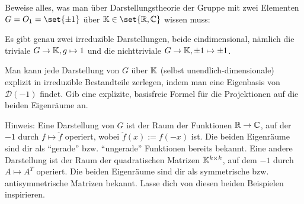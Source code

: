 
\setcounter{sheet}{\thesection}
\setcounter{problem}{0}

\begin{problem}[title={Darstellungstheorie von $O_1$}]
Beweise alles, was man über Darstellungstheorie der Gruppe mit zwei Elementen $G=O_1=\set{\pm 1}$ über $\IK\in\set{\IR,\IC}$ wissen muss:

\begin{subproblem}
Es gibt genau zwei irreduzible Darstellungen, beide eindimensional, nämlich die triviale $G\to\mathbb{K}, g\mapsto 1$ und die nichttriviale $G\to\mathbb{K}, \pm 1\mapsto \pm 1$.
\end{subproblem}
\begin{subproblem}
Man kann jede Darstellung von $G$ über $\mathbb{K}$ (selbst unendlich-dimensionale) explizit in irreduzible Bestandteile zerlegen, indem man eine Eigenbasis von $\mathcal{D}(-1)$ findet. Gib eine explizite, basisfreie Formel für die Projektionen auf die beiden Eigenräume an.
\end{subproblem}

Hinweis: Eine Darstellung von $G$ ist der Raum der Funktionen $\mathbb{R} \to \mathbb{C}$, auf der $-1$ durch $f\mapsto \check{f}$ operiert, wobei $\check{f}(x) := f(-x)$ ist. Die beiden Eigenräume sind dir als \enquote{gerade} bzw. \enquote{ungerade} Funktionen bereits bekannt. Eine andere Darstellung ist der Raum der quadratischen Matrizen $\mathbb{K}^{k\times k}$, auf dem $-1$ durch $A\mapsto A^T$ operiert. Die beiden Eigenräume sind dir als symmetrische bzw. antisymmetrische Matrizen bekannt. Lasse dich von diesen beiden Beispielen inspirieren.
\end{problem}
